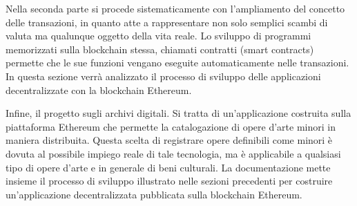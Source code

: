 Nella seconda parte si procede sistematicamente con l’ampliamento del concetto delle transazioni, in quanto atte a rappresentare non solo semplici scambi di valuta ma qualunque oggetto della vita reale. Lo sviluppo di programmi memorizzati sulla blockchain stessa, chiamati contratti (smart contracts) permette che le sue funzioni vengano eseguite automaticamente nelle transazioni. In questa sezione verrà analizzato il processo di sviluppo delle applicazioni decentralizzate con la blockchain Ethereum.

Infine, il progetto sugli archivi digitali. Si tratta di un’applicazione costruita sulla piattaforma Ethereum che permette la catalogazione di opere d’arte minori in maniera distribuita. Questa scelta di registrare opere definibili come minori è dovuta al possibile impiego reale di tale tecnologia, ma è applicabile a qualsiasi tipo di opere d’arte e in generale di beni culturali. La documentazione mette insieme il processo di sviluppo illustrato nelle sezioni precedenti per costruire un’applicazione decentralizzata pubblicata sulla blockchain Ethereum.